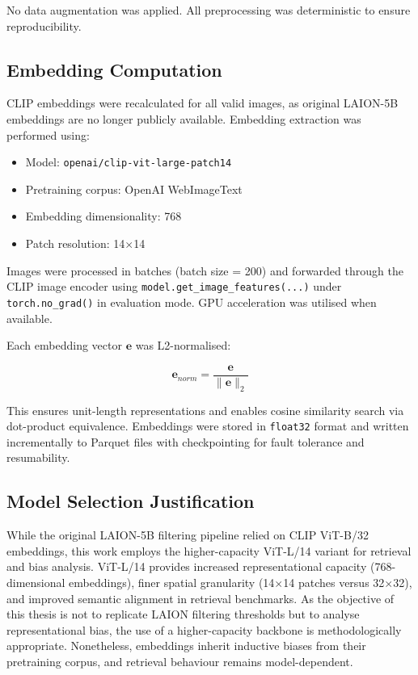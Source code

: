 No data augmentation was applied. All preprocessing was deterministic to ensure reproducibility.

\subsection{Embedding Computation}

CLIP embeddings were recalculated for all valid images, as original LAION-5B embeddings are no longer publicly available. Embedding extraction was performed using:

\begin{itemize}
	\item Model: \texttt{openai/clip-vit-large-patch14}
	\item Pretraining corpus: OpenAI WebImageText
	\item Embedding dimensionality: 768
	\item Patch resolution: 14$\times$14
\end{itemize}

Images were processed in batches (batch size = 200) and forwarded through the CLIP image encoder using \texttt{model.get\_image\_features(...)} under \texttt{torch.no\_grad()} in evaluation mode. GPU acceleration was utilised when available.

Each embedding vector $\mathbf{e}$ was L2-normalised:

\[
\mathbf{e}_{norm} = \frac{\mathbf{e}}{\|\mathbf{e}\|_2}
\]

This ensures unit-length representations and enables cosine similarity search via dot-product equivalence. Embeddings were stored in \texttt{float32} format and written incrementally to Parquet files with checkpointing for fault tolerance and resumability.

\subsection{Model Selection Justification}

While the original LAION-5B filtering pipeline relied on CLIP ViT-B/32 embeddings, this work employs the higher-capacity ViT-L/14 variant for retrieval and bias analysis. ViT-L/14 provides increased representational capacity (768-dimensional embeddings), finer spatial granularity (14$\times$14 patches versus 32$\times$32), and improved semantic alignment in retrieval benchmarks. As the objective of this thesis is not to replicate LAION filtering thresholds but to analyse representational bias, the use of a higher-capacity backbone is methodologically appropriate. Nonetheless, embeddings inherit inductive biases from their pretraining corpus, and retrieval behaviour remains model-dependent.


